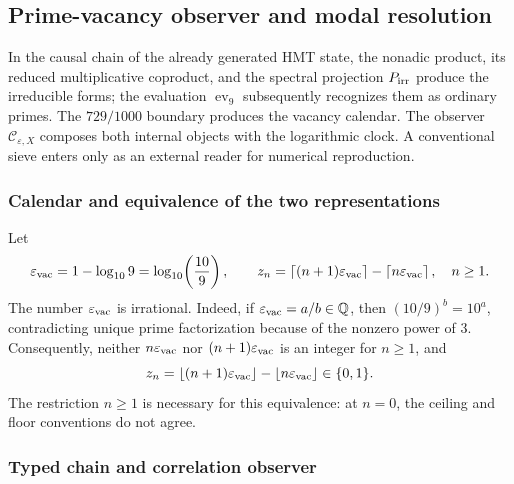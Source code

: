 \subsection{Prime-vacancy observer and modal resolution}
\label{sec:f051-prime-vacancy-observer}

In the causal chain of the already generated HMT state, the nonadic
product, its reduced multiplicative coproduct, and the spectral projection
\(P_{\rm irr}\) produce the irreducible forms; the evaluation
\(\operatorname{ev}_9\) subsequently recognizes them as ordinary primes.
The \(729/1000\) boundary produces the vacancy calendar. The observer
\(\mathcal C_{\varepsilon,X}\) composes both internal objects with the
logarithmic clock. A conventional sieve enters only as an external reader
for numerical reproduction.

\subsubsection{Calendar and equivalence of the two representations}

Let
\begin{equation}
 \varepsilon_{\rm vac}
 =1-\log_{10}9
 =\log_{10}\!\left(\frac{10}{9}\right),
 \qquad
 z_n=\left\lceil(n+1)\varepsilon_{\rm vac}\right\rceil
      -\left\lceil n\varepsilon_{\rm vac}\right\rceil ,
 \quad n\geq1.
 \label{eq:f051-epsilon-calendar}
\end{equation}
The number \(\varepsilon_{\rm vac}\) is irrational. Indeed, if
\(\varepsilon_{\rm vac}=a/b\in\mathbb Q\), then
\((10/9)^b=10^a\), contradicting unique prime factorization because of the
nonzero power of \(3\). Consequently, neither
\(n\varepsilon_{\rm vac}\) nor
\((n+1)\varepsilon_{\rm vac}\) is an integer for \(n\geq1\), and
\begin{equation}
 z_n=\left\lfloor(n+1)\varepsilon_{\rm vac}\right\rfloor
      -\left\lfloor n\varepsilon_{\rm vac}\right\rfloor
 \in\{0,1\}.
 \label{eq:f051-ceil-floor}
\end{equation}
The restriction \(n\geq1\) is necessary for this equivalence: at
\(n=0\), the ceiling and floor conventions do not agree.

\subsubsection{Typed chain and correlation observer}

